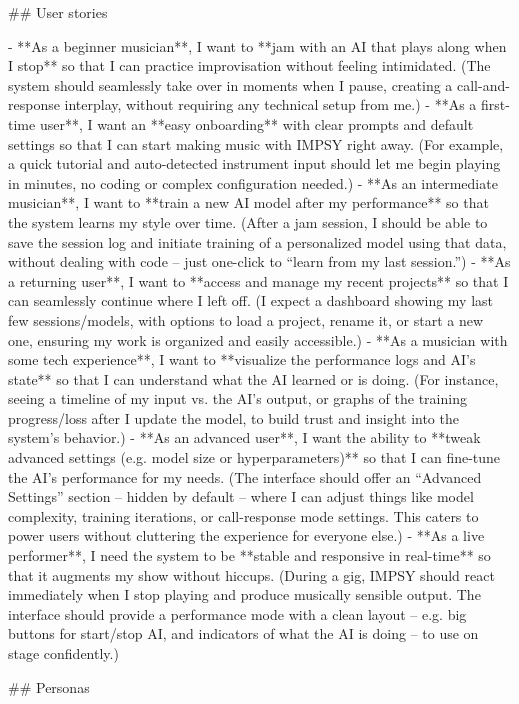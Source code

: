 ## User stories

- **As a beginner musician**, I want to **jam with an AI that plays along when I stop** so that I can practice improvisation without feeling intimidated. (The system should seamlessly take over in moments when I pause, creating a call-and-response interplay, without requiring any technical setup from me.)
- **As a first-time user**, I want an **easy onboarding** with clear prompts and default settings so that I can start making music with IMPSY right away. (For example, a quick tutorial and auto-detected instrument input should let me begin playing in minutes, no coding or complex configuration needed.)
- **As an intermediate musician**, I want to **train a new AI model after my performance** so that the system learns my style over time. (After a jam session, I should be able to save the session log and initiate training of a personalized model using that data, without dealing with code – just one-click to “learn from my last session.”)
- **As a returning user**, I want to **access and manage my recent projects** so that I can seamlessly continue where I left off. (I expect a dashboard showing my last few sessions/models, with options to load a project, rename it, or start a new one, ensuring my work is organized and easily accessible.)
- **As a musician with some tech experience**, I want to **visualize the performance logs and AI’s state** so that I can understand what the AI learned or is doing. (For instance, seeing a timeline of my input vs. the AI’s output, or graphs of the training progress/loss after I update the model, to build trust and insight into the system’s behavior.)
- **As an advanced user**, I want the ability to **tweak advanced settings (e.g. model size or hyperparameters)** so that I can fine-tune the AI’s performance for my needs. (The interface should offer an “Advanced Settings” section – hidden by default – where I can adjust things like model complexity, training iterations, or call-response mode settings. This caters to power users without cluttering the experience for everyone else.)
- **As a live performer**, I need the system to be **stable and responsive in real-time** so that it augments my show without hiccups. (During a gig, IMPSY should react immediately when I stop playing and produce musically sensible output. The interface should provide a performance mode with a clean layout – e.g. big buttons for start/stop AI, and indicators of what the AI is doing – to use on stage confidently.)

## Personas

